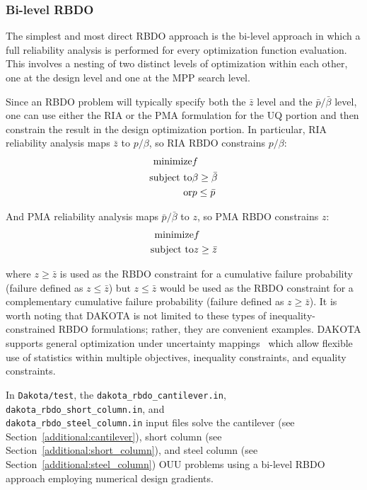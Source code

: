 \subsubsection{Bi-level RBDO} \label{models:ex:ouu:bilev_rbdo}

The simplest and most direct RBDO approach is the bi-level approach in
which a full reliability analysis is performed for every optimization
function evaluation.  This involves a nesting of two distinct levels
of optimization within each other, one at the design level and one at
the MPP search level.

Since an RBDO problem will typically specify both the $\bar{z}$ level
and the $\bar{p}/\bar{\beta}$ level, one can use either the RIA or the
PMA formulation for the UQ portion and then constrain the result in
the design optimization portion.  In particular, RIA reliability
analysis maps $\bar{z}$ to $p/\beta$, so RIA RBDO constrains $p/\beta$:
\begin{eqnarray}
  {\rm minimize }     & f \nonumber \\
  {\rm subject \ to } & \beta \ge \bar{\beta} \nonumber \\
  {\rm or }           & p \le \bar{p} \label{eq:rbdo_ria}
\end{eqnarray}

\noindent And PMA reliability analysis maps $\bar{p}/\bar{\beta}$ to 
$z$, so PMA RBDO constrains $z$:
\begin{eqnarray}
  {\rm minimize }     & f \nonumber \\
  {\rm subject \ to } & z \ge \bar{z} \label{eq:rbdo_pma}
\end{eqnarray}

\noindent where $z \ge \bar{z}$ is used as the RBDO constraint for 
a cumulative failure probability (failure defined as $z \le \bar{z}$)
but $z \le \bar{z}$ would be used as the RBDO constraint for a
complementary cumulative failure probability (failure defined as $z
\ge \bar{z}$).  It is worth noting that DAKOTA is not limited to these
types of inequality-constrained RBDO formulations; rather, they are
convenient examples.  DAKOTA supports general optimization under
uncertainty mappings~\cite{Eld02} which allow flexible use of
statistics within multiple objectives, inequality constraints, and
equality constraints.

In \texttt{Dakota/test}, the \texttt{dakota\_rbdo\_cantilever.in},
\texttt{dakota\_rbdo\_short\_column.in}, and\\
\texttt{dakota\_rbdo\_steel\_column.in} input files solve 
the cantilever (see Section~\ref{additional:cantilever}), short column
(see Section~\ref{additional:short_column}), and steel column (see
Section~\ref{additional:steel_column}) OUU problems using a bi-level
RBDO approach employing numerical design gradients.

